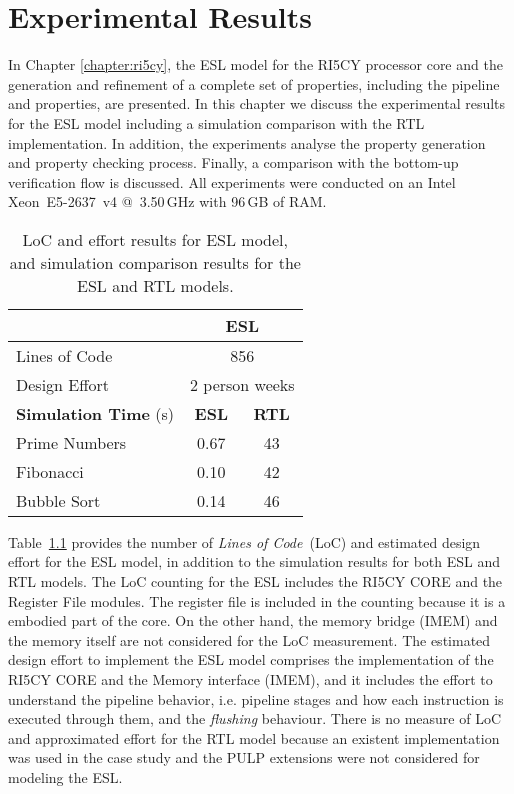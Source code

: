 \chapter{Experimental Results}
\label{chapter:results}


In Chapter \ref{chapter:ri5cy}, the ESL model for the RI5CY processor core and the generation and refinement of a complete set of properties, including the pipeline and \SSQED{} properties, are presented. In this chapter we discuss the experimental results for the ESL model including a simulation comparison with the RTL implementation. In addition, the experiments analyse the property generation and property checking process. Finally, a comparison with the bottom-up verification flow is discussed. All experiments were conducted on an Intel Xeon~E5-2637~v4  @~3.50\,GHz with 96\,GB of RAM.

\begin{table}[htb!] 
	\centering 
	\caption{LoC and effort results for ESL model, and simulation comparison results for the ESL and RTL models.} 
	\label{tab:esl-rtl-comp}
	\begin{tabular}{p{5cm} c c} 
		  &  \multicolumn{2}{c}{\textbf{ESL}} \\     
		\hline	
		Lines of Code  & \multicolumn{2}{c}{856} \\
		Design Effort & \multicolumn{2}{c}{2 person weeks}\\
		\hline
		\textbf{Simulation Time} (s) & \textbf{ESL} & \textbf{RTL}\\
		\hline
		Prime Numbers  &  0.67 & 43 \\
		Fibonacci  &  0.10 & 42 \\
		Bubble Sort  &  0.14 & 46 \\
	\end{tabular} 
\end{table}

Table~\ref{tab:esl-rtl-comp} provides the number of \textit{Lines of Code}~(LoC) and estimated design effort for the ESL model, in addition to the simulation results for both ESL and RTL models. The LoC counting for the ESL includes the RI5CY CORE and the Register File modules. The register file is included in the counting because it is a embodied part of the core. On the other hand, the memory bridge (IMEM) and the memory itself are not considered for the LoC measurement. The estimated design effort to implement the ESL model comprises the implementation of the RI5CY CORE and the Memory interface (IMEM), and it includes the effort to understand the pipeline behavior, i.e. pipeline stages and how each instruction is executed through them, and the \textit{flushing} behaviour. There is no measure of LoC and approximated effort for the RTL model because an existent implementation was used in the case study and the PULP extensions were not considered for modeling the ESL.  



